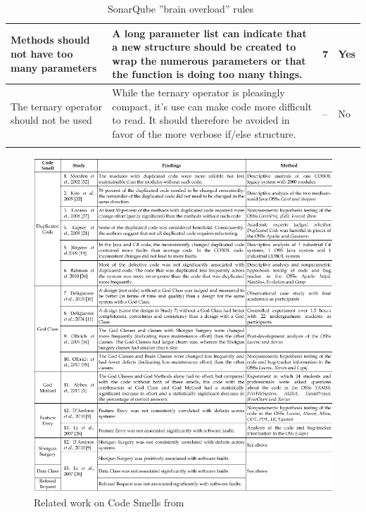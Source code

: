 \documentclass{article}
\begin{document}
\begin{longtable}{L{3cm}|L{8cm}|L{1cm}|L{1cm}}
\midrule
Methods should not have too many parameters & A long parameter list can indicate that a new structure should be created to wrap the numerous parameters or that the function is doing too many things. & 7 & Yes \\
\midrule
The ternary operator should not be used & While the ternary operator is pleasingly compact, it's use can make code more difficult to read. It should therefore be avoided in favor of the more verbose if/else structure. & -- & No \\
\caption{SonarQube ''brain overload'' rules~\cite{sonarqube15}} 
\label{tab:sonarqube}
\end{longtable}


\begin{figure}
\centering
\includegraphics[width=\textwidth]{smell_studies.PNG}
\caption{Related work on Code Smells from \cite{Sjoberg2013}}
\label{fig:rw}
\end{figure}

\printbibliography
\end{document}
